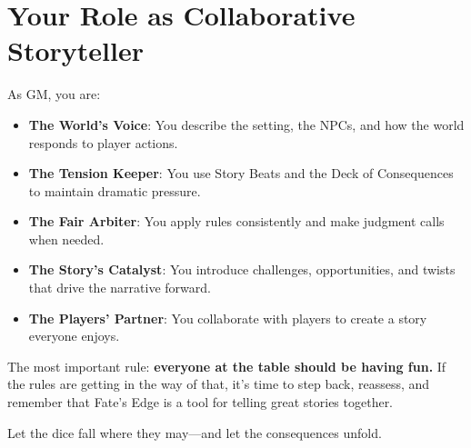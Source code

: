 \section*{Your Role as Collaborative Storyteller}

As GM, you are:
\begin{itemize}
    \item \textbf{The World's Voice}: You describe the setting, the NPCs, and how the world responds to player actions.
    \item \textbf{The Tension Keeper}: You use Story Beats and the Deck of Consequences to maintain dramatic pressure.
    \item \textbf{The Fair Arbiter}: You apply rules consistently and make judgment calls when needed.
    \item \textbf{The Story's Catalyst}: You introduce challenges, opportunities, and twists that drive the narrative forward.
    \item \textbf{The Players' Partner}: You collaborate with players to create a story everyone enjoys.
\end{itemize}

The most important rule: \textbf{everyone at the table should be having fun.} If the rules are getting in the way of that, it's time to step back, reassess, and remember that Fate's Edge is a tool for telling great stories together.

Let the dice fall where they may---and let the consequences unfold.

